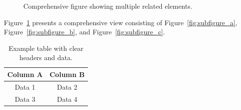 \begin{figure}[H]
    \centering
    \caption{Comprehensive figure showing multiple related elements.}
    \label{fig:whole_figure}
\end{figure}

Figure~\ref{fig:whole_figure} presents a comprehensive view consisting of 
Figure~\ref{fig:subfigure_a}, Figure~\ref{fig:subfigure_b}, and Figure~\ref{fig:subfigure_c}.


\begin{table}[H]
    \centering
    \caption{Example table with clear headers and data.}
    \label{tab:example}
    \begin{tabular}{|c|c|}
        \hline
        \textbf{Column A} & \textbf{Column B} \\
        \hline
        Data 1 & Data 2 \\
        \hline
        Data 3 & Data 4 \\
        \hline
    \end{tabular}
\end{table}

